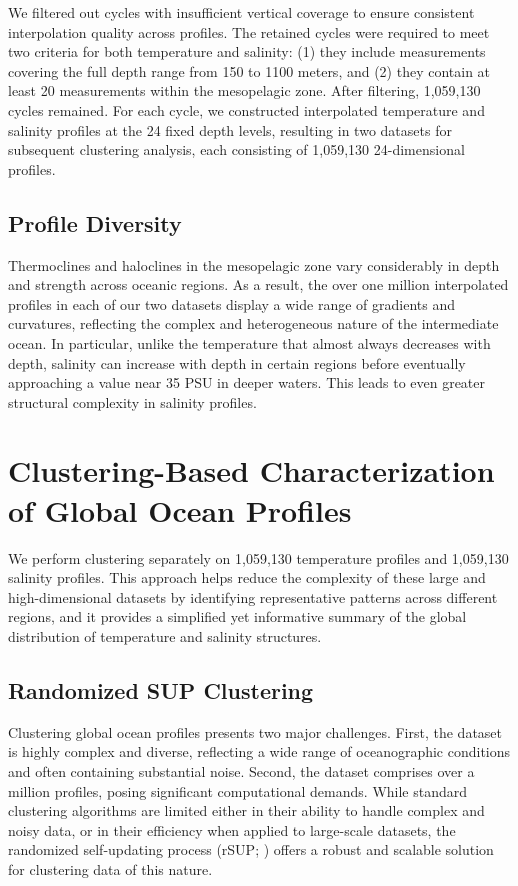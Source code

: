 \documentclass[11pt]{article}
\theoremstyle{plain}
\begin{document}
We filtered out cycles with insufficient vertical coverage to ensure consistent interpolation quality across profiles. The retained cycles were required to meet two criteria for both temperature and salinity: (1) they include measurements covering the full depth range from 150 to 1100 meters, and (2) they contain at least 20 measurements within the mesopelagic zone. After filtering, 1,059,130 cycles remained. For each cycle, we constructed interpolated temperature and salinity profiles at the 24 fixed depth levels, resulting in two datasets for subsequent clustering analysis, each consisting of 1,059,130 24-dimensional profiles.

\subsection{Profile Diversity}
Thermoclines and haloclines in the mesopelagic zone vary considerably in depth and strength across oceanic regions. As a result, the over one million interpolated profiles in each of our two datasets display a wide range of gradients and curvatures, reflecting the complex and heterogeneous nature of the intermediate ocean. In particular, unlike the temperature that almost always decreases with depth, salinity can increase with depth in certain regions before eventually approaching a value near 35 PSU in deeper waters. This leads to even greater structural complexity in salinity profiles.

\section{Clustering-Based Characterization of Global Ocean Profiles}
We perform clustering separately on 1,059,130 temperature profiles and 1,059,130 salinity profiles. This approach helps reduce the complexity of these large and high-dimensional datasets by identifying representative patterns across different regions, and it provides a simplified yet informative summary of the global distribution of temperature and salinity structures.


\subsection{Randomized SUP Clustering}
Clustering global ocean profiles presents two major challenges. First, the dataset is highly complex and diverse, reflecting a wide range of oceanographic conditions and often containing substantial noise. Second, the dataset comprises over a million profiles, posing significant computational demands. While standard clustering algorithms are limited either in their ability to handle complex and noisy data, or in their efficiency when applied to large-scale datasets, the randomized self-updating process (rSUP; \citealt{shiu2024randomized}) offers a robust and scalable solution for clustering data of this nature.
\end{document}
